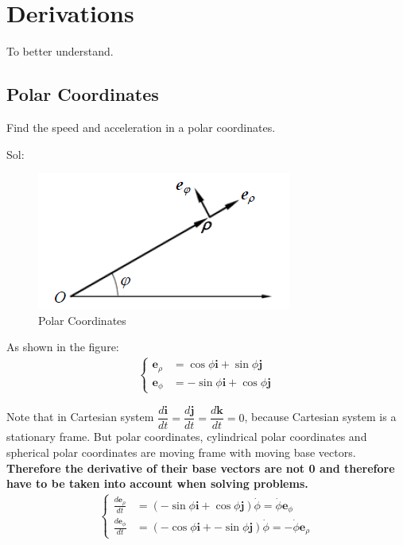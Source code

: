 \documentclass[11pt, a4paper, oneside]{book}
\numberwithin{equation}{section}%
\begin{document}


\chapter{Derivations}

To better understand.

\section{Polar Coordinates}
Find the speed and acceleration in a polar coordinates. 

Sol:
\begin{figure}[H]
	\centering
	\includegraphics[width=0.3\linewidth]{"Polar Coordinates"}
	\caption{Polar Coordinates}
	\label{fig::Polar Coordinates}
\end{figure}

As shown in the figure:
\begin{align}
	\left\{
	\begin{aligned}
	\bm{e}_\rho &= \cos\phi \bm{i} + \sin\phi \bm{j}\\
	\bm{e}_\phi &= -\sin\phi \bm{i} + \cos\phi \bm{j}
	\end{aligned}
	\right.
\end{align}

Note that in Cartesian system $\dfrac{d\bm{i}}{dt} = \dfrac{d\bm{j}}{dt} = \dfrac{d\bm{k}}{dt} = 0$, because Cartesian system is a stationary frame. But polar coordinates, cylindrical polar coordinates and spherical polar coordinates are moving frame with moving base vectors. \textbf{Therefore the derivative of their base vectors are not 0 and therefore have to be taken into account when solving problems.} 
\begin{align}
\left\{
\begin{aligned}
\frac{d\bm{e}_\rho}{dt} &= (-\sin\phi \bm{i} + \cos\phi \bm{j})\dot{\phi} = \dot{\phi}\bm{e}_\phi\\
\frac{d\bm{e}_\phi}{dt} &= (-\cos\phi \bm{i} + -\sin\phi \bm{j})\dot{\phi} = -\dot{\phi}\bm{e}_\rho
\end{aligned}
\right.
\end{align}
\end{document}
